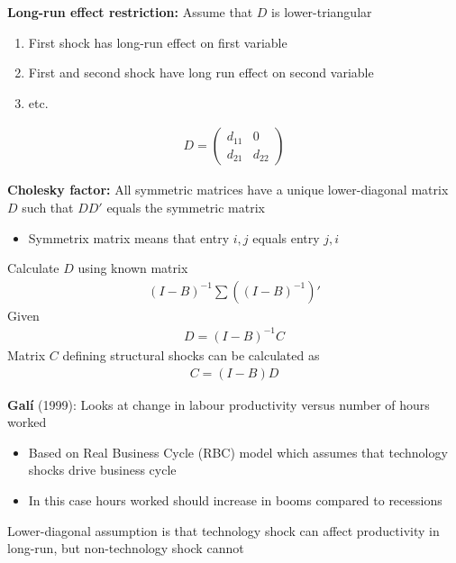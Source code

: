 \documentclass{beamer}
\begin{document}
\begin{frame}
\textbf{Long-run effect restriction:} Assume that $D$ is lower-triangular
\medskip  
  \begin{enumerate}
    \item First shock has long-run effect on first variable
    \item First and second shock have long run effect on second variable
    \item etc.
  \end{enumerate}
  \begin{align}
    D= \begin{pmatrix} d_{11} & 0 \\ d_{21} & d_{22} \end{pmatrix}
  \end{align}
\end{frame}

\begin{frame}
  \textbf{Cholesky factor:} All symmetric matrices have a unique lower-diagonal matrix $D$ such that $DD'$ equals the symmetric matrix
  \begin{itemize}
    \item Symmetrix matrix means that entry $i,j$ equals entry $j,i$
  \end{itemize}
  \medskip
  Calculate $D$ using known matrix
  \begin{align}
    (I-B)^{-1}\sum \left( (I-B)^{-1} \right)'
  \end{align}
  Given 
  \begin{align}
    D=(I-B)^{-1}C
  \end{align}
  Matrix $C$ defining structural shocks can be calculated as  
  \begin{align}
    C=(I-B)D
  \end{align}
\end{frame}

\begin{frame}
  \textbf{Galí} (1999): Looks at change in labour productivity versus number of hours worked
  \begin{itemize}
    \item Based on Real Business Cycle (RBC) model which assumes that technology shocks drive business cycle
    \item In this case hours worked should increase in booms compared to recessions
  \end{itemize}
  \medskip
  Lower-diagonal assumption is that technology shock can affect productivity in long-run, but non-technology shock cannot
\end{frame}
\end{document}
